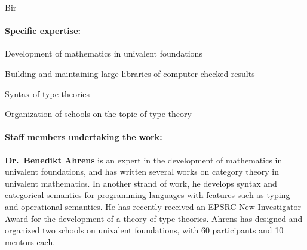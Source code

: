 \begin{sitedescription}{Bir}

\paragraph{Specific expertise:}

\begin{compactitem}
\item Development of mathematics in univalent foundations
\item Building and maintaining large libraries of computer-checked results
\item Syntax of type theories
\item Organization of schools on the topic of type theory
\item {}
\end{compactitem}

\paragraph{Staff members undertaking the work:}

\textbf{Dr.\ Benedikt Ahrens} is an expert in the development of mathematics in univalent foundations, and has written several works on category theory in univalent mathematics.
In another strand of work, he develops syntax and categorical semantics for programming languages with features such as typing and operational semantics.
He has recently received an EPSRC New Investigator Award for the development of a theory of type theories.
Ahrens has designed and organized two schools on univalent foundations, with 60 participants and 10 mentors each.







\end{sitedescription}

